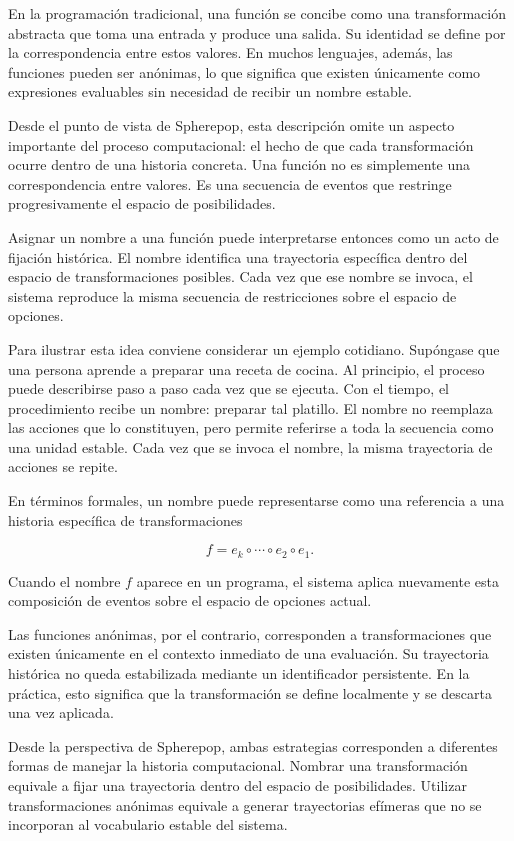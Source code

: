 \documentclass[12pt]{article}
\begin{document}
En la programación tradicional, una función se concibe como una transformación abstracta que toma una entrada y produce una salida. Su identidad se define por la correspondencia entre estos valores. En muchos lenguajes, además, las funciones pueden ser anónimas, lo que significa que existen únicamente como expresiones evaluables sin necesidad de recibir un nombre estable.

Desde el punto de vista de Spherepop, esta descripción omite un aspecto importante del proceso computacional: el hecho de que cada transformación ocurre dentro de una historia concreta. Una función no es simplemente una correspondencia entre valores. Es una secuencia de eventos que restringe progresivamente el espacio de posibilidades.

Asignar un nombre a una función puede interpretarse entonces como un acto de fijación histórica. El nombre identifica una trayectoria específica dentro del espacio de transformaciones posibles. Cada vez que ese nombre se invoca, el sistema reproduce la misma secuencia de restricciones sobre el espacio de opciones.

Para ilustrar esta idea conviene considerar un ejemplo cotidiano. Supóngase que una persona aprende a preparar una receta de cocina. Al principio, el proceso puede describirse paso a paso cada vez que se ejecuta. Con el tiempo, el procedimiento recibe un nombre: preparar tal platillo. El nombre no reemplaza las acciones que lo constituyen, pero permite referirse a toda la secuencia como una unidad estable. Cada vez que se invoca el nombre, la misma trayectoria de acciones se repite.

En términos formales, un nombre puede representarse como una referencia a una historia específica de transformaciones

\[
f = e_k \circ \cdots \circ e_2 \circ e_1 .
\]

Cuando el nombre \(f\) aparece en un programa, el sistema aplica nuevamente esta composición de eventos sobre el espacio de opciones actual.

Las funciones anónimas, por el contrario, corresponden a transformaciones que existen únicamente en el contexto inmediato de una evaluación. Su trayectoria histórica no queda estabilizada mediante un identificador persistente. En la práctica, esto significa que la transformación se define localmente y se descarta una vez aplicada.

Desde la perspectiva de Spherepop, ambas estrategias corresponden a diferentes formas de manejar la historia computacional. Nombrar una transformación equivale a fijar una trayectoria dentro del espacio de posibilidades. Utilizar transformaciones anónimas equivale a generar trayectorias efímeras que no se incorporan al vocabulario estable del sistema.
\end{document}
